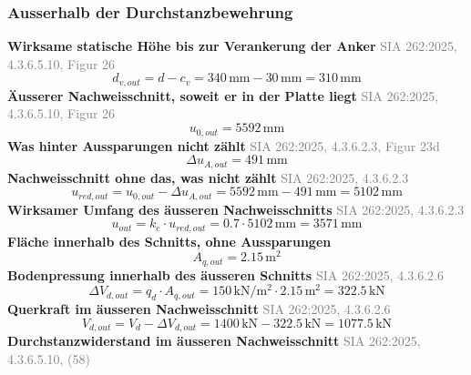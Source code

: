 \documentclass[11pt,a4paper]{article}
\newcommand{\normref}[1]{{\small\textcolor{gray}{#1}}}
\begin{document}
\subsubsection{Ausserhalb der Durchstanzbewehrung}
\noindent\textbf{Wirksame statische Höhe bis zur Verankerung der Anker} \hfill \normref{SIA 262:2025, 4.3.6.5.10, Figur 26}
\begin{equation*}
d_{v,out} = d - c_v = 340\,\mathrm{mm} - 30\,\mathrm{mm} = 310\,\mathrm{mm}
\end{equation*}
\noindent\textbf{Äusserer Nachweisschnitt, soweit er in der Platte liegt} \hfill \normref{SIA 262:2025, 4.3.6.5.10, Figur 26}
\begin{equation*}
u_{0,out} = 5592\,\mathrm{mm}
\end{equation*}
\noindent\textbf{Was hinter Aussparungen nicht zählt} \hfill \normref{SIA 262:2025, 4.3.6.2.3, Figur 23d}
\begin{equation*}
\Delta u_{A,out} = 491\,\mathrm{mm}
\end{equation*}
\noindent\textbf{Nachweisschnitt ohne das, was nicht zählt} \hfill \normref{SIA 262:2025, 4.3.6.2.3}
\begin{equation*}
u_{red,out} = u_{0,out} - \Delta u_{A,out} = 5592\,\mathrm{mm} - 491\,\mathrm{mm} = 5102\,\mathrm{mm}
\end{equation*}
\noindent\textbf{Wirksamer Umfang des äusseren Nachweisschnitts} \hfill \normref{SIA 262:2025, 4.3.6.2.3}
\begin{equation*}
u_{out} = k_e \cdot u_{red,out} = 0.7 \cdot 5102\,\mathrm{mm} = 3571\,\mathrm{mm}
\end{equation*}
\noindent\textbf{Fläche innerhalb des Schnitts, ohne Aussparungen}
\begin{equation*}
A_{q,out} = 2.15\,\mathrm{m}^{2}
\end{equation*}
\noindent\textbf{Bodenpressung innerhalb des äusseren Schnitts} \hfill \normref{SIA 262:2025, 4.3.6.2.6}
\begin{equation*}
\Delta V_{d,out} = q_d \cdot A_{q,out} = 150\,\mathrm{kN}/\mathrm{m}^{2} \cdot 2.15\,\mathrm{m}^{2} = 322.5\,\mathrm{kN}
\end{equation*}
\noindent\textbf{Querkraft im äusseren Nachweisschnitt} \hfill \normref{SIA 262:2025, 4.3.6.2.6}
\begin{equation*}
V_{d,out} = V_d - \Delta V_{d,out} = 1400\,\mathrm{kN} - 322.5\,\mathrm{kN} = 1077.5\,\mathrm{kN}
\end{equation*}
\noindent\textbf{Durchstanzwiderstand im äusseren Nachweisschnitt} \hfill \normref{SIA 262:2025, 4.3.6.5.10, (58)}
\end{document}
